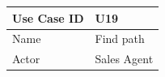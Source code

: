 \documentclass[12pt]{article}
\begin{document}
\begin{table}[H]
\begin{tabular}{|l|l|}
\hline
Use Case ID & U19                                                                                                                                                                                                                                                                                                                                                                                                                                                                                                                                                                                                                                                                                                                                                                                                                                                                                                                                                                                                                     \\ \hline
Name        & Find path                                                                                                                                                                                                                                                                                                                                                                                                                                                                                                                                                                                                                                                                                                                                                                                                                                                                                                                                                                                                               \\ \hline
Actor       & Sales Agent                                                                                                                                                                                                                                                                                                                                                                                                                                                                                                                                                                                                                                                                                                                                                                                                                                                                                                                                                                                                             \\ \hline

\end{tabular}
\end{table}
\end{document}
